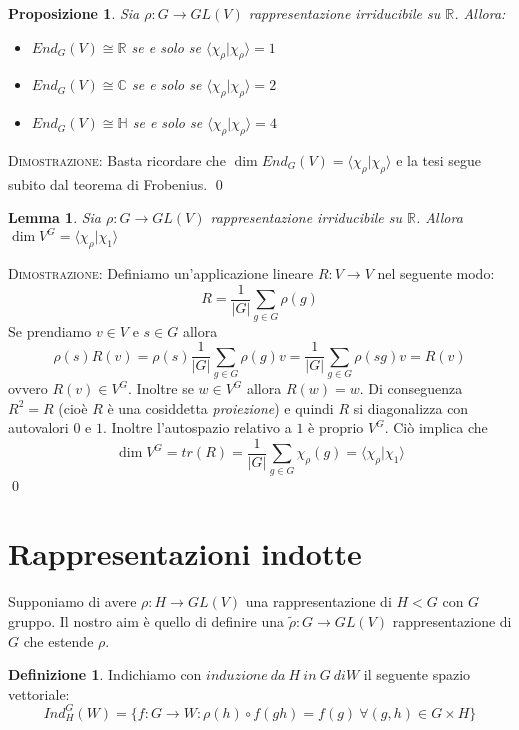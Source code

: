 \documentclass[11pt]{article}
\theoremstyle{plain}
\newtheorem{lemma}[thm]{Lemma}
\newtheorem{prop}[thm]{Proposizione}
\theoremstyle{definition}
\newtheorem{defn}{Definizione}[section]
\theoremstyle{remark}
\newcommand{\C}{\mathbb{C}}
\newcommand{\R}{\mathbb{R}}
\newcommand{\HH}{\mathbb{H}}
\begin{document}
\begin{prop}
Sia $\rho:G\to GL(V)$ rappresentazione irriducibile su $\R$. Allora:
\begin{itemize}
\item $End_G(V) \cong \R$ se e solo se $\langle\chi_\rho|\chi_\rho\rangle = 1$
\item $End_G(V) \cong \C$ se e solo se $\langle\chi_\rho|\chi_\rho\rangle = 2$
\item $End_G(V) \cong \HH$ se e solo se $\langle\chi_\rho|\chi_\rho\rangle = 4$
\end{itemize}
\end{prop}
\textsc{Dimostrazione: }
Basta ricordare che $\dim End_G(V) = \langle\chi_\rho|\chi_\rho\rangle$ e la tesi segue subito
dal teorema di Frobenius.
\qed

\begin{lemma}
Sia $\rho:G\to GL(V)$ rappresentazione irriducibile su $\R$. Allora $\dim V^G = \langle\chi_\rho|\chi_1\rangle$
\end{lemma}
\textsc{Dimostrazione: }
Definiamo un'applicazione lineare $R:V\to V$ nel seguente modo:
\[ R = \frac{1}{|G|} \sum_{g\in G}{\rho(g)} \]
Se prendiamo $v\in V$ e $s\in G$ allora
\[ \rho(s) R(v) = \rho(s)\frac{1}{|G|} \sum_{g\in G}{\rho(g)v} = \frac{1}{|G|} \sum_{g\in G}{\rho(sg)v} = R(v)\]
ovvero $R(v)\in V^G$.
Inoltre se $w\in V^G$ allora $R(w)=w$. Di conseguenza $R^2 = R$ (cioè $R$ è una cosiddetta \emph{proiezione})
e quindi $R$ si diagonalizza con autovalori $0$ e $1$. Inoltre l'autospazio relativo a $1$ è proprio $V^G$.
Ciò implica che
\[ \dim V^G = tr(R) = \frac{1}{|G|} \sum_{g\in G}{\chi_\rho(g)} = \langle\chi_\rho|\chi_1\rangle \]
\qed









\newpage
\section{Rappresentazioni indotte}
Supponiamo di avere $\rho:H\rightarrow GL(V)$ una rappresentazione di $H<G$ con $G$ gruppo. Il nostro aim è quello di definire una $\widetilde{\rho}:G\rightarrow GL(V)$ rappresentazione di $G$ che estende $\rho$.

\begin{defn}Indichiamo con $induzione\ da\ H\ in \ G\ di W$ il seguente spazio vettoriale:
\[Ind_H^G(W)=\{f:G\rightarrow W: \rho(h)\circ f(gh)=f(g)\ \forall (g,h)\in G\times H\}   \]
\end{defn}
\end{document}
